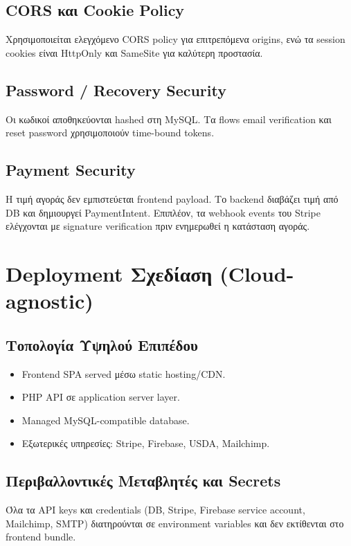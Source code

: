 \documentclass[12pt,a4paper]{report}
\begin{document}
\subsection{CORS και Cookie Policy}
Χρησιμοποιείται ελεγχόμενο CORS policy για επιτρεπόμενα origins, ενώ τα session cookies είναι \textenglish{HttpOnly} και \textenglish{SameSite} για καλύτερη προστασία.

\subsection{Password / Recovery Security}
Οι κωδικοί αποθηκεύονται hashed στη MySQL. Τα flows email verification και reset password χρησιμοποιούν time-bound tokens.

\subsection{Payment Security}
Η τιμή αγοράς δεν εμπιστεύεται frontend payload. Το backend διαβάζει τιμή από DB και δημιουργεί PaymentIntent. Επιπλέον, τα webhook events του Stripe ελέγχονται με signature verification πριν ενημερωθεί η κατάσταση αγοράς.

\newpage

\section{Deployment Σχεδίαση (Cloud-agnostic)}

\subsection{Τοπολογία Υψηλού Επιπέδου}
\begin{itemize}[label=•]
    \item Frontend SPA served μέσω static hosting/CDN.
    \item PHP API σε application server layer.
    \item Managed MySQL-compatible database.
    \item Εξωτερικές υπηρεσίες: Stripe, Firebase, USDA, Mailchimp.
\end{itemize}

\subsection{Περιβαλλοντικές Μεταβλητές και Secrets}
Όλα τα API keys και credentials (DB, Stripe, Firebase service account, Mailchimp, SMTP) διατηρούνται σε environment variables και δεν εκτίθενται στο frontend bundle.
\end{document}
